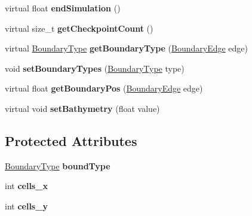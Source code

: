 \begin{DoxyCompactItemize}
\item 
\hypertarget{classSWE__Scenario_ae7ed72f584069e9885c33c4ca83f3ff5}{virtual float {\bfseries end\-Simulation} ()}\label{classSWE__Scenario_ae7ed72f584069e9885c33c4ca83f3ff5}

\item 
\hypertarget{classSWE__Scenario_a0c36b8d2bc8d1fc42af68309f958817a}{virtual size\-\_\-t {\bfseries get\-Checkpoint\-Count} ()}\label{classSWE__Scenario_a0c36b8d2bc8d1fc42af68309f958817a}

\item 
\hypertarget{classSWE__Scenario_ab8fe7ce15d7758fb0c4e0e3887b34a5d}{virtual \hyperlink{SWE__Scenario_8hh_af75d5dd7322fa39ed0af4e7839e600f8}{Boundary\-Type} {\bfseries get\-Boundary\-Type} (\hyperlink{SWE__Scenario_8hh_aa5e01e3f7df312f7b9b0d02521141fcc}{Boundary\-Edge} edge)}\label{classSWE__Scenario_ab8fe7ce15d7758fb0c4e0e3887b34a5d}

\item 
\hypertarget{classSWE__Scenario_aef7a53a5d791bee0545488735381c6a2}{void {\bfseries set\-Boundary\-Types} (\hyperlink{SWE__Scenario_8hh_af75d5dd7322fa39ed0af4e7839e600f8}{Boundary\-Type} type)}\label{classSWE__Scenario_aef7a53a5d791bee0545488735381c6a2}

\item 
\hypertarget{classSWE__Scenario_a1b01e953c2079b64f527c9bc5a0c86d7}{virtual float {\bfseries get\-Boundary\-Pos} (\hyperlink{SWE__Scenario_8hh_aa5e01e3f7df312f7b9b0d02521141fcc}{Boundary\-Edge} edge)}\label{classSWE__Scenario_a1b01e953c2079b64f527c9bc5a0c86d7}

\item 
\hypertarget{classSWE__Scenario_abe735c081530f2258a083de425cca9eb}{virtual void {\bfseries set\-Bathymetry} (float value)}\label{classSWE__Scenario_abe735c081530f2258a083de425cca9eb}

\end{DoxyCompactItemize}
\subsection*{Protected Attributes}
\begin{DoxyCompactItemize}
\item 
\hypertarget{classSWE__Scenario_abe1a2cbf009889f9330091b9d28833f0}{\hyperlink{SWE__Scenario_8hh_af75d5dd7322fa39ed0af4e7839e600f8}{Boundary\-Type} {\bfseries bound\-Type}}\label{classSWE__Scenario_abe1a2cbf009889f9330091b9d28833f0}

\item 
\hypertarget{classSWE__Scenario_afa6dda8b7b69dc1514b26b8de5fa321b}{int {\bfseries cells\-\_\-x}}\label{classSWE__Scenario_afa6dda8b7b69dc1514b26b8de5fa321b}

\item 
\hypertarget{classSWE__Scenario_a4cd13fca6b6ab5290426b55b5dd755ff}{int {\bfseries cells\-\_\-y}}\label{classSWE__Scenario_a4cd13fca6b6ab5290426b55b5dd755ff}

\end{DoxyCompactItemize}


